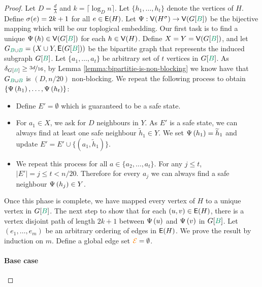 \documentclass[11pt]{article}
\begin{document}
\begin{proof}
Let $D = \frac{d}{\lambda}$ and $k =  \lceil\log_D n\rceil$.
Let $\{ h_1, \dots, h_t\}$ denote the vertices of $H$.
Define $\sigma(e) = 2k+1$ for all $e \in \mathsf{E}(H)$.
Let $\EmbeddingFunc: \Vertices{\Subdivision{H}{\sigma}} \rightarrow \Vertices{G[{\GreenB}]}$ be the bijective mapping which will be our toplogical embedding.
Our first task is to find a unique $\Embedding{h} \in \Vertices{G[\GreenB]}$ for each $h \in \mathsf{V}(H)$.
Define $X = Y = \Vertices{G[\GreenB]}$, and let $\BipartiteG = (X \cup Y, \Edges{G[\GreenB]})$ be the bipartite graph that represents the induced subgraph $G[\GreenB]$.
Let $\{a_1, \dots, a_{t}\}$ be arbitrary set of $t$ vertices in $G[\GreenB]$.
As $\MinimalDegree{G[\GreenB]} \geq \nicefrac{3d}{16}$, by Lemma \ref{lemma:bipartitie-is-non-blocking} we know have that $\BipartiteG$ is $(D, n/20)$ non-blocking.
We repeat the following process to obtain $\{ \Psi\left(h_1\right), \dots, \Psi\left(h_t\right)\}$:

\begin{itemize}
\item Define $E' = \emptyset$ which is guaranteed to be a  safe state.

\item For $a_1 \in X$, we ask for $D$ neighbours in $Y$. As $E'$ is a safe state, we can always find at least one safe neighbour $\tilde{h}_1 \in Y$. We set $\Psi\left(h_1\right) = \widetilde{h}_1$ and update $E' = E'  \cup \{(a_1, \tilde{h}_1)\}$.

\item We repeat this process for all $a \in \{a_2, \dots, a_t\}$. For any $j \leq t$,  $|E'| = j \leq t < n/20$.
  Therefore for every $a_j$ we can always find a safe neighbour $\Psi\left(h_j\right) \in Y$.

\end{itemize}

Once this phase is complete, we have mapped every vertex of $H$ to a unique vertex in $G[\GreenB]$.
The next step to show that for each $(u,v) \in \mathsf{E}(H)$, there is a vertex disjoint path of length $2k+1$ between $\Psi\left(u\right)$ and $\Psi\left(v\right)$ in $G[\GreenB]$.
Let $(e_1, \dots, e_m)$ be an arbitrary ordering of edges in $\mathsf{E}(H)$.
We prove the result by induction on $m$. Define a global edge set  $\textcolor{orange}{\mathcal{E}} = \emptyset$.

\paragraph{Base case}


\end{proof}
\end{document}
